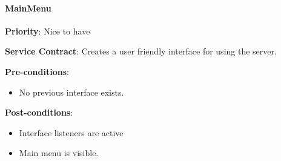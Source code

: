         \paragraph{MainMenu}
			\begin{description}
			    \item{\textbf{Priority}:} Nice to have%
			    \item{\textbf{Service Contract}:} Creates a user friendly interface for using the server.%
			    \item{\textbf{Pre-conditions}:}%
    			    \begin{itemize}
    			        \item No previous interface exists.
    			    \end{itemize}
			    \item{\textbf{Post-conditions}:} %
    			    \begin{itemize}
    			    \item Interface listeners are active
    			    \item Main menu is visible.
    			    \end{itemize}
			\end{description}
	   	
				